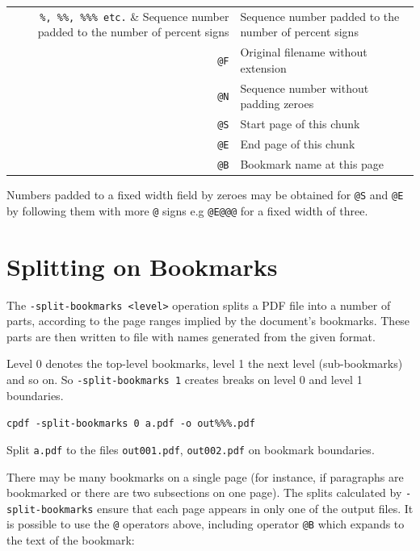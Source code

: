 \documentclass{book}
\begin{document}
\begin{center}
\begin{tabular}{rl}
  \verb!%, %%, %%% etc.! & Sequence number padded to the number of percent signs\\
  \texttt{@F} & Original filename without extension \\
  \texttt{@N} & Sequence number without padding zeroes \\
  \texttt{@S} & Start page of this chunk \\
  \texttt{@E} & End page of this chunk \\
  \texttt{@B} & Bookmark name at this page \\
\end{tabular}
\end{center}

\noindent Numbers padded to a fixed width field by zeroes may be obtained for \texttt{@S} and \texttt{@E} by following them with more \texttt{@} signs e.g \texttt{@E@@@} for a fixed width of three.

  \section{Splitting on Bookmarks}
  The \texttt{-split-bookmarks <level>} operation splits a PDF file into a number of
parts, according to the page ranges implied by the document's bookmarks. These
parts are then written to file with names generated from the given format.
  
Level 0 denotes the top-level bookmarks, level 1 the next level (sub-bookmarks)
and so on. So \texttt{-split-bookmarks 1} creates breaks on level 0 and level
1 boundaries.

  \begin{framed}\small
    \noindent\verb!cpdf -split-bookmarks 0 a.pdf -o out%%%.pdf!

    \vspace{2.5mm}
    \noindent Split \texttt{a.pdf} to the files \texttt{out001.pdf},
\texttt{out002.pdf} on bookmark boundaries.

  \end{framed}
\noindent There may be many bookmarks on a single page (for instance, if
paragraphs are bookmarked or there are two subsections on one page). The splits
calculated by \texttt{-split-bookmarks} ensure that each page appears in only
one of the output files.
  It is possible to use the \texttt{@} operators above, including operator \texttt{@B} which expands to the text of the bookmark:
\end{document}
